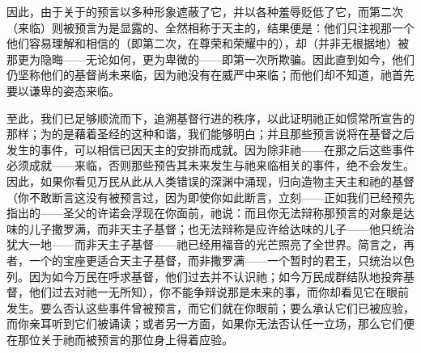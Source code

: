 因此，由于关于的预言以多种形象遮蔽了它，并以各种羞辱贬低了它，而第二次（来临）则被预言为是显露的、全然相称于天主的，结果便是：他们只注视那一个他们容易理解和相信的（即第二次，在尊荣和荣耀中的），却（并非无根据地）被那更为隐晦——无论如何，更为卑微的——即第一次所欺骗。因此直到如今，他们仍坚称他们的基督尚未来临，因为祂没有在威严中来临；而他们却不知道，祂首先要以谦卑的姿态来临。\par

至此，我们已足够顺流而下，追溯基督行进的秩序，以此证明祂正如惯常所宣告的那样；为的是藉着圣经的这种和谐，我们能够明白；并且那些预言说将在基督之后发生的事件，可以相信已因天主的安排而成就。因为除非祂——在那之后这些事件必须成就——来临，否则那些预告其未来发生与祂来临相关的事件，绝不会发生。因此，如果你看见万民从此从人类错误的深渊中涌现，归向造物主天主和祂的基督（你不敢断言这没有被预言过，因为即使你如此断言，立刻——正如我们已经预先指出的——圣父的许诺会浮现在你面前，祂说：而且你无法辩称那预言的对象是达味的儿子撒罗满，而非天主子基督；也无法辩称是应许给达味的儿子——他只统治犹大一地——而非天主子基督——祂已经用福音的光芒照亮了全世界。简言之，再者，一个的宝座更适合天主子基督，而非撒罗满——一个暂时的君王，只统治以色列。因为如今万民在呼求基督，他们过去并不认识祂；如今万民成群结队地投奔基督，他们过去对祂一无所知），你不能争辩说那是未来的事，而你却看见它在眼前发生。要么否认这些事件曾被预言，而它们就在你眼前；要么承认它们已被应验，而你亲耳听到它们被诵读；或者另一方面，如果你无法否认任一立场，那么它们便在那位关于祂而被预言的那位身上得着应验。\par

